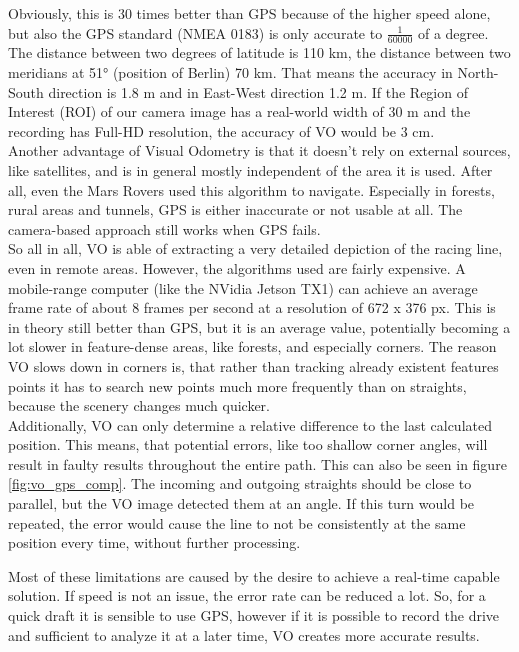 Obviously, this is 30 times better than GPS because of the higher speed alone, but also the GPS standard (NMEA 0183) is only accurate to $\frac{1}{60 000}$ of a degree. The distance between two degrees of latitude is 110 km, the distance between two meridians at 51° (position of Berlin) 70 km. That means the accuracy in North-South direction is 1.8 m and in East-West direction 1.2 m. If the Region of Interest (ROI) of our camera image has a real-world width of 30 m and the recording has Full-HD resolution, the accuracy of VO would be 3 cm.\\
Another advantage of Visual Odometry is that it doesn't rely on external sources, like satellites, and is in general mostly independent of the area it is used. After all, even the Mars Rovers used this algorithm to navigate. Especially in forests, rural areas and tunnels, GPS is either inaccurate or not usable at all. The camera-based approach still works when GPS fails.\\
So all in all, VO is able of extracting a very detailed depiction of the racing line, even in remote areas. However, the algorithms used are fairly expensive.
A mobile-range computer (like the NVidia Jetson TX1) can achieve an average frame rate of about 8 frames per second at a resolution of 672 x 376 px. This is in theory still better than GPS, but it is an average value, potentially becoming a lot slower in feature-dense areas, like forests, and especially corners. The reason VO slows down in corners is, that rather than tracking already existent features points it has to search new points much more frequently than on straights, because the scenery changes much quicker.\\
Additionally, VO can only determine a relative difference to the last calculated position. This means, that potential errors, like too shallow corner angles, will result in faulty results throughout the entire path. This can also be seen in figure \ref{fig:vo_gps_comp}. The incoming and outgoing straights should be close to parallel, but the VO image detected them at an angle. If this turn would be repeated, the error would cause the line to not be consistently at the same position every time, without further processing.

Most of these limitations are caused by the desire to achieve a real-time capable solution. If speed is not an issue, the error rate can be reduced a lot. So, for a quick draft it is sensible to use GPS, however if it is possible to record the drive and sufficient to analyze it at a later time, VO creates more accurate results. 

